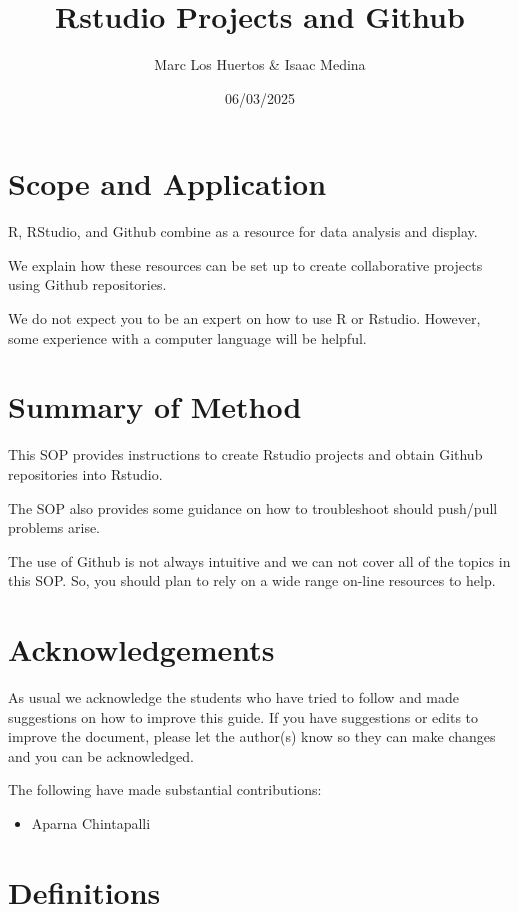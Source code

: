 \documentclass[12pt]{../SOP4_alpha}\usepackage[]{graphicx}\usepackage[]{xcolor}
\author{Marc Los Huertos \& Isaac Medina}
\title{Rstudio Projects and Github}
\date{06/03/2025}
\begin{document}
\maketitle

\section{Scope and Application}

\NP R, RStudio, and Github combine as a resource for data analysis and display.

\NP We explain how these resources can be set up to create collaborative projects using Github repositories. 

\NP We do not expect you to be an expert on how to use R or Rstudio. However, some experience with a computer language will be helpful. 

\section{Summary of Method}

\NP This SOP provides instructions to create Rstudio projects and obtain Github repositories into Rstudio. 

\NP The SOP also provides some guidance on how to troubleshoot should push/pull problems arise.

\NP The use of Github is not always intuitive and we can not cover all of the topics in this SOP. So, you should plan to rely on a wide range on-line resources to help.

\tableofcontents

\newpage

\section{Acknowledgements}

As usual we acknowledge the students who have tried to follow and made suggestions on how to improve this guide. If you have suggestions or edits to improve the document, please let the author(s) know so they can make changes and you can be acknowledged.

The following have made substantial contributions:

\begin{itemize}
\item Aparna Chintapalli
\end{itemize}

\section{Definitions}
\end{document}
